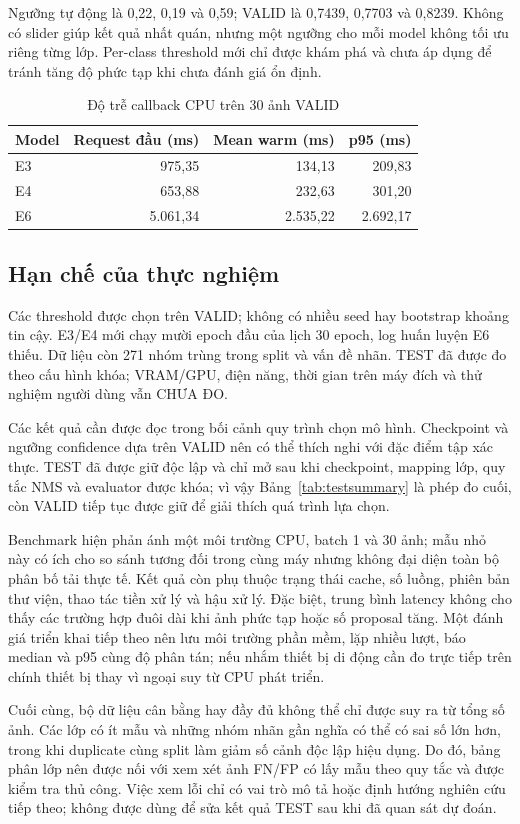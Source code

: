 \documentclass[12pt,a4paper,oneside]{report}
\begin{document}
Ngưỡng tự động là 0,22, 0,19 và 0,59; VALID là 0,7439, 0,7703 và 0,8239. Không có slider giúp kết quả nhất quán, nhưng một ngưỡng cho mỗi model không tối ưu riêng từng lớp. Per-class threshold mới chỉ được khám phá và chưa áp dụng để tránh tăng độ phức tạp khi chưa đánh giá ổn định.
\begin{table}[H]\centering\small
\caption{Độ trễ callback CPU trên 30 ảnh VALID}\label{tab:callback}
\begin{tabular}{lrrr}\toprule
Model & Request đầu (ms) & Mean warm (ms) & p95 (ms)\\\midrule
E3 & 975,35 & 134,13 & 209,83\\
E4 & 653,88 & 232,63 & 301,20\\
E6 & 5.061,34 & 2.535,22 & 2.692,17\\
\bottomrule\end{tabular}\end{table}
\subsection{Hạn chế của thực nghiệm}
Các threshold được chọn trên VALID; không có nhiều seed hay bootstrap khoảng tin cậy. E3/E4 mới chạy mười epoch đầu của lịch 30 epoch, log huấn luyện E6 thiếu. Dữ liệu còn 271 nhóm trùng trong split và vấn đề nhãn. TEST đã được đo theo cấu hình khóa; VRAM/GPU, điện năng, thời gian trên máy đích và thử nghiệm người dùng vẫn CHƯA ĐO.

Các kết quả cần được đọc trong bối cảnh quy trình chọn mô hình. Checkpoint và ngưỡng confidence dựa trên VALID nên có thể thích nghi với đặc điểm tập xác thực. TEST đã được giữ độc lập và chỉ mở sau khi checkpoint, mapping lớp, quy tắc NMS và evaluator được khóa; vì vậy Bảng~\ref{tab:testsummary} là phép đo cuối, còn VALID tiếp tục được giữ để giải thích quá trình lựa chọn.

Benchmark hiện phản ánh một môi trường CPU, batch 1 và 30 ảnh; mẫu nhỏ này có ích cho so sánh tương đối trong cùng máy nhưng không đại diện toàn bộ phân bố tải thực tế. Kết quả còn phụ thuộc trạng thái cache, số luồng, phiên bản thư viện, thao tác tiền xử lý và hậu xử lý. Đặc biệt, trung bình latency không cho thấy các trường hợp đuôi dài khi ảnh phức tạp hoặc số proposal tăng. Một đánh giá triển khai tiếp theo nên lưu môi trường phần mềm, lặp nhiều lượt, báo median và p95 cùng độ phân tán; nếu nhắm thiết bị di động cần đo trực tiếp trên chính thiết bị thay vì ngoại suy từ CPU phát triển.

Cuối cùng, bộ dữ liệu cân bằng hay đầy đủ không thể chỉ được suy ra từ tổng số ảnh. Các lớp có ít mẫu và những nhóm nhãn gần nghĩa có thể có sai số lớn hơn, trong khi duplicate cùng split làm giảm số cảnh độc lập hiệu dụng. Do đó, bảng phân lớp nên được nối với xem xét ảnh FN/FP có lấy mẫu theo quy tắc và được kiểm tra thủ công. Việc xem lỗi chỉ có vai trò mô tả hoặc định hướng nghiên cứu tiếp theo; không được dùng để sửa kết quả TEST sau khi đã quan sát dự đoán.
\end{document}
